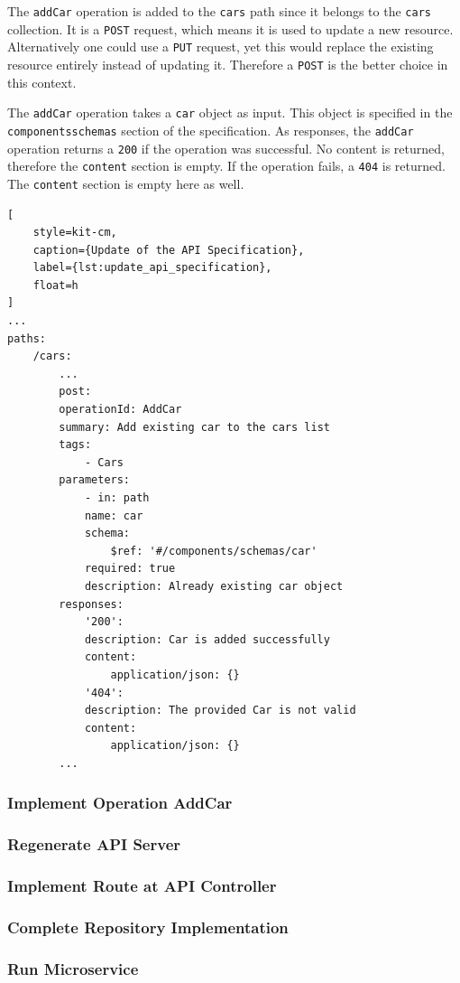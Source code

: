 The \texttt{addCar} operation is added to the \texttt{cars} path since it belongs to the \texttt{cars} collection.
It is a \texttt{POST} request, which means it is used to update a new resource.
Alternatively one could use a \texttt{PUT} request, yet this would replace the existing resource entirely instead of updating it.
Therefore a \texttt{POST} is the better choice in this context.

The \texttt{addCar} operation takes a \texttt{car} object as input.
This object is specified in the \texttt{components\/schemas} section of the specification.
As responses, the \texttt{addCar} operation returns a \texttt{200} if the operation was successful.
No content is returned, therefore the \texttt{content} section is empty.
If the operation fails, a \texttt{404} is returned.
The \texttt{content} section is empty here as well.

\begin{lstlisting}[
    style=kit-cm,
    caption={Update of the API Specification},
    label={lst:update_api_specification},
    float=h
]
...
paths:
    /cars:
        ...
        post:
        operationId: AddCar
        summary: Add existing car to the cars list
        tags:
            - Cars
        parameters:
            - in: path
            name: car
            schema:
                $ref: '#/components/schemas/car'
            required: true
            description: Already existing car object
        responses:
            '200':
            description: Car is added successfully
            content:
                application/json: {}
            '404':
            description: The provided Car is not valid
            content:
                application/json: {}
        ...
\end{lstlisting}
\subsubsection*{Implement Operation AddCar}
\subsubsection*{Regenerate API Server}
\subsubsection*{Implement Route at API Controller}
\subsubsection*{Complete Repository Implementation}
\subsubsection*{Run Microservice}